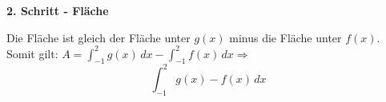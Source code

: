 \documentclass[12pt]{scrartcl}
\begin{document}
\hfill \break
\textbf{2. Schritt - Fläche}

Die Fläche ist gleich der Fläche unter $g(x)$ minus die Fläche unter $f(x)$.\\
Somit gilt:
$A = \int_{-1}^{2} g(x)\, dx - \int_{-1}^{2} f(x)\, dx \Rightarrow$
\[ \int_{-1}^{2} g(x) - f(x)\, dx \]




% 
\end{document}
